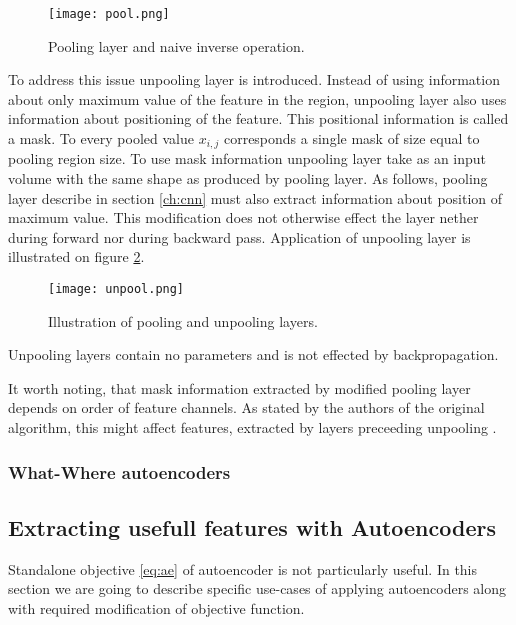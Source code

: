 \begin{figure}[h!]
  \centering
    \texttt{[image: pool.png]}
  \caption{Pooling layer and naive inverse operation.}
  \label{fig:pool}
\end{figure}

To address this issue unpooling layer is introduced. Instead of using information about only maximum value of the feature in the region, unpooling layer also uses information about positioning of the feature. This positional information is called a mask. To every pooled value $x_{i,j}$ corresponds a single mask of size equal to pooling region size. To use mask information  unpooling layer take as an input volume with the same shape as produced by pooling layer. As follows, pooling layer describe in section \ref{ch:cnn} must also extract information about position of maximum value. This modification does not otherwise effect the layer nether during forward nor during backward pass. Application of unpooling layer is illustrated on figure \ref{fig:unpool}.

\begin{figure}[h!]
  \centering
    \texttt{[image: unpool.png]}
  \caption{Illustration of pooling and unpooling layers.}
  \label{fig:unpool}
\end{figure}

Unpooling layers contain no parameters and is not effected by backpropagation.

It worth noting, that mask information extracted by modified pooling layer depends on order of feature channels. As stated by the authors of the original algorithm, this might affect features, extracted by layers preceeding unpooling \cite{Zhao2015}.

\subsubsection{What-Where autoencoders}



\subsection{Extracting usefull features with Autoencoders}\label{ch:sae}

Standalone objective \ref{eq:ae} of autoencoder is not particularly useful.
In this section we are going to describe specific use-cases of applying autoencoders along with required modification of objective function.


